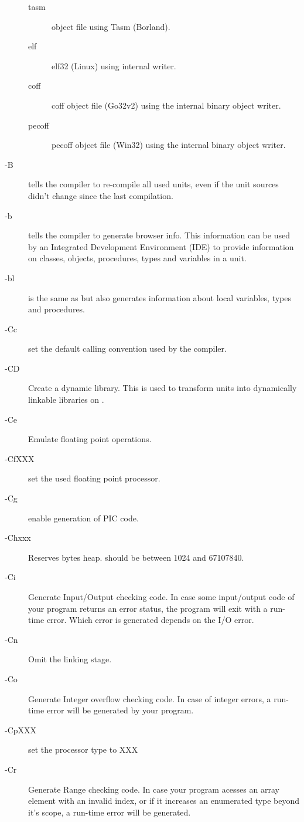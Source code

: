 \begin{description}
\begin{description}
\item[tasm] object file using Tasm (Borland).
\item[elf] elf32 (Linux) using internal writer.
\item[coff] coff object file (Go32v2) using the internal binary object writer.
\item[pecoff] pecoff object file (Win32) using the internal binary object writer.
\end{description}
\item[-B]  tells the compiler to re-compile all used units, even
if the unit sources didn't change since the last compilation.
\item[-b]  tells the compiler to generate browser info. This information can
be used by an Integrated Development Environment (IDE) to provide information
on classes, objects, procedures, types  and variables in a unit.
\item[-bl]  is the same as  but also generates
information about local variables, types and procedures.
\item[-Cc] set the default calling convention used by the compiler.
\item [-CD] Create a dynamic library. This is used to transform units into
dynamically linkable libraries on \linux.
\item[-Ce] Emulate floating point operations.
\item[-CfXXX] set the used floating point processor.
\item[-Cg] enable generation of PIC code.
\item [-Chxxx]  Reserves  bytes heap.  should
be between 1024 and 67107840.
\item [-Ci]  Generate Input/Output checking code. In case some
input/output code of your program returns an error status, the program will
exit with a run-time error. Which error is generated depends on the I/O error.
\item [-Cn]  Omit the linking stage.
\item [-Co]  Generate Integer overflow checking code. In case of
integer errors, a run-time error will be generated by your program.
\item [-CpXXX] set the processor type to XXX
\item [-Cr]  Generate Range checking code. In case your program
acesses an array element with an invalid index, or if it increases an
enumerated type beyond it's scope, a run-time error will be generated.

\end{description}
